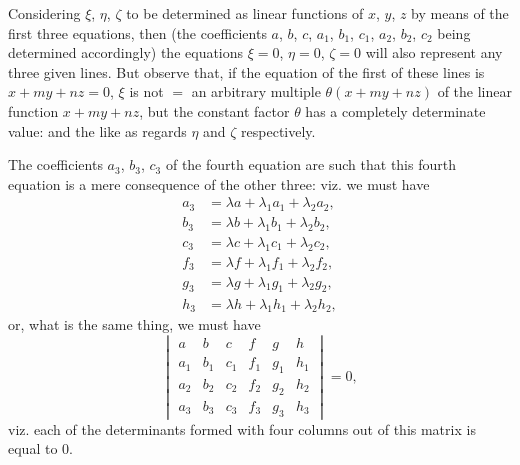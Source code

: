\documentclass[11pt,a4paper]{book}
\begin{document}
\medskip


\medskip

Considering $\xi$, $\eta$, $\zeta$ to be determined as linear functions of $x$, $y$, $z$ by means of the first three equations, then (the coefficients $a$, $b$, $c$, $a_1$, $b_1$, $c_1$, $a_2$, $b_2$, $c_2$ being determined accordingly) the equations $\xi = 0$, $\eta = 0$, $\zeta = 0$ will also represent any three given lines. But observe that, if the equation of the first of these lines is $x + my + nz = 0$, $\xi$ is not $=$ an arbitrary multiple $\theta(x + my + nz)$ of the linear function $x + my + nz$, but the constant factor $\theta$ has a completely determinate value: and the like as regards $\eta$ and $\zeta$ respectively.

The coefficients $a_3$, $b_3$, $c_3$ of the fourth equation are such that this fourth equation is a mere consequence of the other three: viz. we must have
\begin{align*}
a_3 &= \lambda a + \lambda_1 a_1 + \lambda_2 a_2,\\
b_3 &= \lambda b + \lambda_1 b_1 + \lambda_2 b_2,\\
c_3 &= \lambda c + \lambda_1 c_1 + \lambda_2 c_2,\\
f_3 &= \lambda f + \lambda_1 f_1 + \lambda_2 f_2,\\
g_3 &= \lambda g + \lambda_1 g_1 + \lambda_2 g_2,\\
h_3 &= \lambda h + \lambda_1 h_1 + \lambda_2 h_2,
\end{align*}
or, what is the same thing, we must have
\[
\begin{vmatrix}
a & b & c & f & g & h \\
a_1 & b_1 & c_1 & f_1 & g_1 & h_1 \\
a_2 & b_2 & c_2 & f_2 & g_2 & h_2 \\
a_3 & b_3 & c_3 & f_3 & g_3 & h_3
\end{vmatrix} = 0,
\]
viz. each of the determinants formed with four columns out of this matrix is equal to 0.
\end{document}

